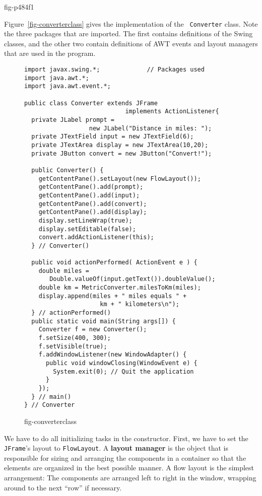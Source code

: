 {fig-p484f1}


Figure~\ref{fig-converterclass} gives the implementation of the {\tt
Converter} class. Note the three packages that are imported.  The
first contains definitions of the Swing classes, and the other two
contain definitions of AWT events and layout managers that are used in
the program.

\begin{figure}[h!]
\jjjprogstart
\begin{jjjlisting}
\begin{lstlisting}
import javax.swing.*;             // Packages used
import java.awt.*;
import java.awt.event.*;

public class Converter extends JFrame 
                            implements ActionListener{
  private JLabel prompt = 
                  new JLabel("Distance in miles: ");
  private JTextField input = new JTextField(6);
  private JTextArea display = new JTextArea(10,20);
  private JButton convert = new JButton("Convert!");

  public Converter() {
    getContentPane().setLayout(new FlowLayout());
    getContentPane().add(prompt);
    getContentPane().add(input);
    getContentPane().add(convert);
    getContentPane().add(display);
    display.setLineWrap(true);
    display.setEditable(false);
    convert.addActionListener(this);
  } // Converter()

  public void actionPerformed( ActionEvent e ) {
    double miles = 
       Double.valueOf(input.getText()).doubleValue();
    double km = MetricConverter.milesToKm(miles);
    display.append(miles + " miles equals " + 
                     km + " kilometers\n");
  } // actionPerformed()
  public static void main(String args[]) {
    Converter f = new Converter();
    f.setSize(400, 300);
    f.setVisible(true);
    f.addWindowListener(new WindowAdapter() {      
      public void windowClosing(WindowEvent e) {
        System.exit(0); // Quit the application
      }
    });
  } // main()
} // Converter
\end{lstlisting}
\end{jjjlisting}
{fig-converterclass}
\end{figure}

We have to do all initializing tasks in the constructor.  First,
we have to set the {\tt JFrame}'s layout to {\tt FlowLayout}.  A {\bf
layout manager} is the object that is
responsible for sizing and arranging the components in a container so
that the elements are organized in the best possible manner.  A flow
layout is the simplest arrangement: The components are arranged left
to right in the window, wrapping around to the next ``row'' if
necessary.


